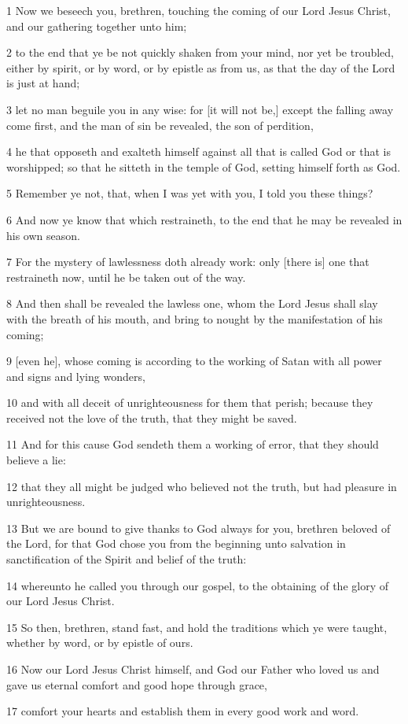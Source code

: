 \par 1 Now we beseech you, brethren, touching the coming of our Lord Jesus Christ, and our gathering together unto him;
\par 2 to the end that ye be not quickly shaken from your mind, nor yet be troubled, either by spirit, or by word, or by epistle as from us, as that the day of the Lord is just at hand;
\par 3 let no man beguile you in any wise: for [it will not be,] except the falling away come first, and the man of sin be revealed, the son of perdition,
\par 4 he that opposeth and exalteth himself against all that is called God or that is worshipped; so that he sitteth in the temple of God, setting himself forth as God.
\par 5 Remember ye not, that, when I was yet with you, I told you these things?
\par 6 And now ye know that which restraineth, to the end that he may be revealed in his own season.
\par 7 For the mystery of lawlessness doth already work: only [there is] one that restraineth now, until he be taken out of the way.
\par 8 And then shall be revealed the lawless one, whom the Lord Jesus shall slay with the breath of his mouth, and bring to nought by the manifestation of his coming;
\par 9 [even he], whose coming is according to the working of Satan with all power and signs and lying wonders,
\par 10 and with all deceit of unrighteousness for them that perish; because they received not the love of the truth, that they might be saved.
\par 11 And for this cause God sendeth them a working of error, that they should believe a lie:
\par 12 that they all might be judged who believed not the truth, but had pleasure in unrighteousness.
\par 13 But we are bound to give thanks to God always for you, brethren beloved of the Lord, for that God chose you from the beginning unto salvation in sanctification of the Spirit and belief of the truth:
\par 14 whereunto he called you through our gospel, to the obtaining of the glory of our Lord Jesus Christ.
\par 15 So then, brethren, stand fast, and hold the traditions which ye were taught, whether by word, or by epistle of ours.
\par 16 Now our Lord Jesus Christ himself, and God our Father who loved us and gave us eternal comfort and good hope through grace,
\par 17 comfort your hearts and establish them in every good work and word.

